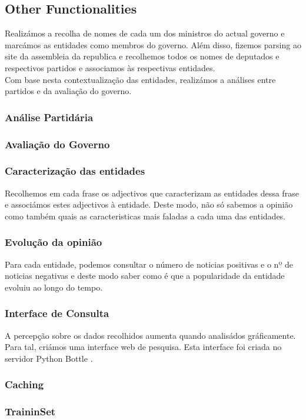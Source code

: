 \subsection{Other Functionalities}
Realizámos a recolha de nomes de cada um dos ministros do actual governo e marcámos as entidades como membros do governo. Além disso, fizemos parsing ao site da assembleia da republica e recolhemos todos os nomes de deputados e respectivos partidos e associamos às respectivas entidades.\\
Com base nesta contextualização das entidades, realizámos a análises entre partidos e da avaliação do governo.

\subsubsection{Análise Partidária}

\subsubsection{Avaliação do Governo}
\subsubsection{Caracterização das entidades}
Recolhemos em cada frase os adjectivos que caracterizam as entidades dessa frase e associámos estes adjectivos à entidade. Deste modo, não só sabemos a opinião como também quais as caracteristicas mais faladas a cada uma das entidades.

\subsubsection{Evolução da opinião}
Para cada entidade, podemos consultar o número de noticias positivas e o nº de noticias negativas e deste modo saber como é que a popularidade da entidade evoluiu ao longo do tempo.

\subsubsection{Interface de Consulta}
A percepção sobre os dados recolhidos aumenta quando analisádos gráficamente. Para tal, criámos uma interface web de pesquisa. Esta interface foi criada no servidor Python Bottle \cite{bottle}.

\subsubsection{Caching}

\subsubsection{TraininSet}